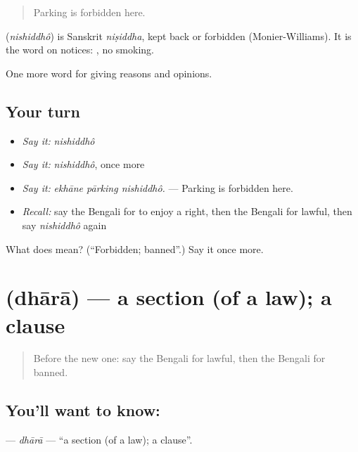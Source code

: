 \begin{quote}
Parking is forbidden here.
\end{quote}

\begin{cousinweb}
\textbf{} (\emph{nishiddhô}) is Sanskrit \emph{niṣiddha}, kept back or forbidden (Monier-Williams). It is the word on notices:  , no smoking.
\end{cousinweb}

\begin{grammarlens}[title={What you've built}]
One more word for giving reasons and opinions.
\end{grammarlens}

\subsection*{Your turn}
\begin{itemize}
\raggedright
  \item \emph{Say it:} \emph{nishiddhô}
  \item \emph{Say it:} \emph{nishiddhô}, once more
  \item \emph{Say it:} \emph{ekhāne pārking nishiddhô.} — Parking is forbidden here.
  \item \emph{Recall:} say the Bengali for to enjoy a right, then the Bengali for lawful, then say \emph{nishiddhô} again
\end{itemize}

\begin{tcolorbox}[breakable,colback=teal!4,colframe=teal!35!black,title={Before you move on}]
What does  mean? (\textquotedblleft{}Forbidden; banned\textquotedblright{}.) Say it once more.
\end{tcolorbox}
\section[\texorpdfstring{\bn{ধারা} (dhārā)}{ধারা (dhārā)}]{ (dhārā) — a section (of a law); a clause}

\label{lesson:BN-C340-dhara}



\begin{quote}
Before the new one: say the Bengali for lawful, then the Bengali for banned.
\end{quote}

\subsection*{You'll want to know: }
\textbf{} — \emph{dhārā} — \textquotedblleft{}a section (of a law); a clause\textquotedblright{}.

